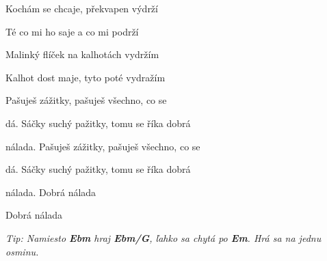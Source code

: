 \begin{song}
\bigskip

Kochám se chcaje, překvapen výdrží \par
Té co mi ho saje a co mi podrží \par
Malinký flíček na kalhotách vydržím \par
Kalhot dost maje, tyto poté vydražím \par

\bigskip

 Pašuješ zážitky, pašuješ všechno, co se \par
{}dá. Sáčky suchý pažitky, tomu se říka dobrá \par
nálada. Pašuješ zážitky, pašuješ všechno, co se \par
{}dá. Sáčky suchý pažitky, tomu se říka dobrá \par

\bigskip

nálada.   Dobrá nálada  \par
{} Dobrá nálada   \par
{}  \par

\bigskip
\bigskip

\textit{\smaller
Tip: Namiesto \textbf{Ebm} hraj \textbf{Ebm/G}, ľahko sa chytá po \textbf{Em}.
Hrá sa na jednu osminu.
}

\end{song}
